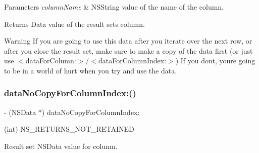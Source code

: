 \begin{DoxyParams}{Parameters}
{\em column\+Name} & {\ttfamily N\+S\+String} value of the name of the column.\\
\hline
\end{DoxyParams}
\begin{DoxyReturn}{Returns}
Data value of the result set\textquotesingle{}s column.
\end{DoxyReturn}
\begin{DoxyWarning}{Warning}
If you are going to use this data after you iterate over the next row, or after you close the result set, make sure to make a copy of the data first (or just use {\ttfamily $<$data\+For\+Column\+:$>$}/{\ttfamily $<$data\+For\+Column\+Index\+:$>$}) If you don\textquotesingle{}t, you\textquotesingle{}re going to be in a world of hurt when you try and use the data. 
\end{DoxyWarning}
\mbox{\label{interface_o_p_t_l_y_f_m_d_b_result_set_aa044fe54559ae3068230851fb0f7c7b1}} 
\subsubsection{\texorpdfstring{data\+No\+Copy\+For\+Column\+Index\+:()}{dataNoCopyForColumnIndex:()}}
{\footnotesize\ttfamily -\/ (N\+S\+Data $\ast$) data\+No\+Copy\+For\+Column\+Index\+: \begin{DoxyParamCaption}\item[{(int)}]{N\+S\+\_\+\+R\+E\+T\+U\+R\+N\+S\+\_\+\+N\+O\+T\+\_\+\+R\+E\+T\+A\+I\+N\+ED }\end{DoxyParamCaption}}

Result set {\ttfamily N\+S\+Data} value for column.


